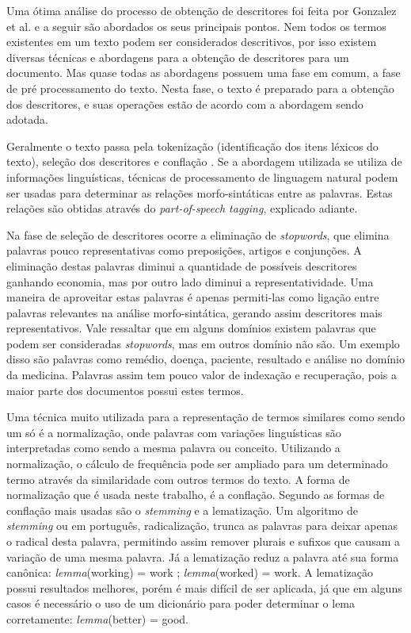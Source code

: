 Uma ótima análise do processo de obtenção de descritores foi feita por Gonzalez et al. \cite{Gonzalez2006} e a seguir são abordados os seus principais pontos. Nem todos os termos existentes em um texto podem ser considerados descritivos, por isso existem diversas técnicas e abordagens para a obtenção de descritores para um documento. Mas quase todas as abordagens possuem uma fase em comum, a fase de pré processamento do texto. Nesta fase, o texto é preparado para a obtenção dos descritores, e suas operações estão de acordo com a abordagem sendo adotada.

 Geralmente o texto passa pela tokenização (identificação dos itens léxicos do texto), seleção dos descritores e conflação \cite{Yates1999}. Se a abordagem utilizada se utiliza de informações linguísticas, técnicas de processamento de linguagem natural podem ser usadas para determinar as relações morfo-sintáticas entre as palavras. Estas relações são obtidas através do \emph{part-of-speech tagging}, explicado adiante.

Na fase de seleção de descritores ocorre a eliminação de \emph{stopwords}, que elimina palavras pouco representativas como preposições, artigos e conjunções. A eliminação destas palavras diminui a quantidade de possíveis descritores ganhando economia, mas por outro lado diminui a representatividade. Uma maneira de aproveitar estas palavras é apenas permiti-las como ligação entre palavras relevantes na análise morfo-sintática, gerando assim descritores mais representativos. Vale ressaltar que em alguns domínios existem palavras que podem ser consideradas \emph{stopwords}, mas em outros domínio não são. Um exemplo disso são palavras como remédio, doença, paciente, resultado e análise no domínio da medicina. Palavras assim tem pouco valor de indexação e recuperação, pois a maior parte dos documentos possui estes termos.

Uma técnica muito utilizada para a representação de termos similares como sendo um só é a normalização, onde palavras com variações linguísticas são interpretadas como sendo a mesma palavra ou conceito. Utilizando a normalização, o cálculo de frequência pode ser ampliado para um determinado termo através da similaridade com outros termos do texto. A forma de normalização que é usada neste trabalho, é a conflação. Segundo \cite{Gonzalez2006} as formas de conflação mais usadas são o \emph{stemming} e a lematização. Um algoritmo de \emph{stemming} ou em português, radicalização, trunca as palavras para deixar apenas o radical desta palavra, permitindo assim remover plurais e sufixos que causam a variação de uma mesma palavra. Já a lematização reduz a palavra até sua forma canônica: \emph{lemma}(working) = work ; \emph{lemma}(worked) = work. A lematização possui resultados melhores, porém é mais difícil de ser aplicada, já que em alguns casos é necessário o uso de um dicionário para poder determinar o lema corretamente: \emph{lemma}(better) = good.

